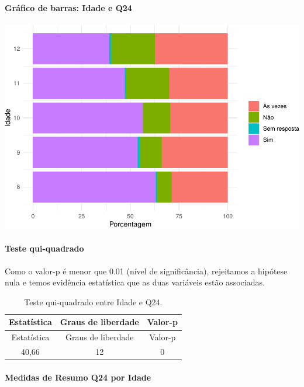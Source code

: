 \documentclass[]{article}
\let\oldparagraph\paragraph
\renewcommand{\paragraph}[1]{\oldparagraph{#1}\mbox{}}
\begin{document}
\hypertarget{gruxe1fico-de-barras-idade-e-q24}{%
\paragraph{Gráfico de barras: Idade e Q24}\label{gruxe1fico-de-barras-idade-e-q24}}

\begin{center}\includegraphics[width=0.75\linewidth]{relatorio_covid19_files/figure-latex/unnamed-chunk-623-1} \end{center}

\hypertarget{teste-qui-quadrado-54}{%
\paragraph{Teste qui-quadrado}\label{teste-qui-quadrado-54}}

Como o valor-p é menor que 0.01 (nível de significância), rejeitamos a hipótese nula e temos evidência estatística que as duas variáveis estão associadas.

\begin{longtable}[]{@{}ccc@{}}
\caption{\label{tab:unnamed-chunk-625}Teste qui-quadrado entre Idade e Q24.}\tabularnewline
\toprule
Estatística & Graus de liberdade & Valor-p\tabularnewline
\midrule
\endfirsthead
\toprule
Estatística & Graus de liberdade & Valor-p\tabularnewline
\midrule
\endhead
40,66 & 12 & 0\tabularnewline
\bottomrule
\end{longtable}

\cleardoublepage

\hypertarget{medidas-de-resumo-q24-por-idade}{%
\paragraph{Medidas de Resumo Q24 por Idade}\label{medidas-de-resumo-q24-por-idade}}
\end{document}
